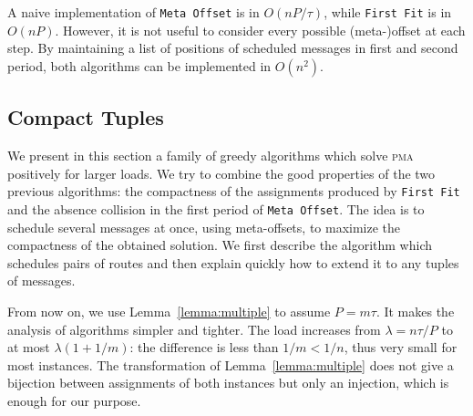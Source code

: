 \documentclass[a4paper,cleveref, autoref, thm-restate,UKenglish]{lipics-v2019}
\newcommand\pma{\textsc{pma}\xspace}
\newcommand\firstfit{\texttt{First Fit}\xspace}
\newcommand\metaoffset{\texttt{Meta Offset}\xspace}
\begin{document}
A naive implementation of \metaoffset is in $O(n P/\tau)$, while \firstfit is in $O(nP)$.
However, it is not useful to consider every possible (meta-)offset at each step. By maintaining
a list of positions of scheduled messages in first and second period, both algorithms can be implemented in $O(n^2)$.

\subsection{Compact Tuples}

We present in this section a family of greedy algorithms which solve \pma positively for larger loads. We try to combine the good properties of the two previous algorithms: the compactness of the assignments produced by \firstfit and the absence collision in the first period of \metaoffset. The idea is to schedule several messages at once, using meta-offsets, to maximize the compactness of the obtained solution. We first describe the algorithm which schedules pairs of routes and then explain quickly how to extend it to any tuples of messages.


From now on, we use Lemma~\ref{lemma:multiple} to assume $P = m\tau$. It makes the analysis of algorithms simpler and tighter. The load increases from $\lambda = n \tau / P$ to at most $\lambda (1 + 1/m)$: the difference is less than $1/m < 1/n$, thus very small for most instances. The transformation of Lemma~\ref{lemma:multiple} does not give a bijection between assignments of both instances but only an injection, which is enough for our purpose. 
\end{document}

